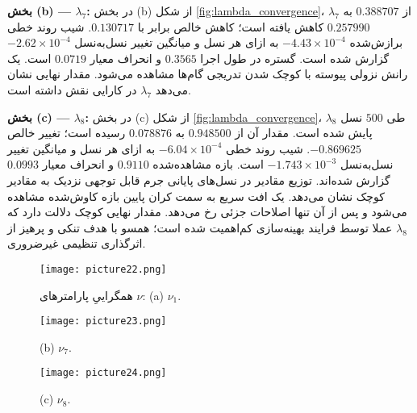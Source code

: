 \medskip
\textbf{بخش (b) — \(\lambda_7\):}
در بخش (b) از شکل \ref{fig:lambda_convergence}، \(\lambda_7\) از \(0.388707\) به \(0.257990\) کاهش یافته است؛ کاهش خالص برابر با \(0.130717\). شیب روند خطی برازش‌شده \(-4.43\times 10^{-4}\) به ازای هر نسل و میانگین تغییر نسل‌به‌نسل \(-2.62\times 10^{-4}\) گزارش شده است. گستره در طول اجرا \(0.3565\) و انحراف معیار \(0.0719\) است. یک رانش نزولی پیوسته با کوچک شدن تدریجی گام‌ها مشاهده می‌شود. مقدار نهایی نشان می‌دهد \(\lambda_7\) در کارایی  نقش داشته است.

\medskip
\textbf{بخش (c) — \(\lambda_8\):}
در بخش (c) از شکل \ref{fig:lambda_convergence}، \(\lambda_8\) طی \(500\) نسل پایش شده است. مقدار آن از \(0.948500\) به \(0.078876\) رسیده است؛ تغییر خالص \(-0.869625\). شیب روند خطی \(-6.04\times 10^{-4}\) به ازای هر نسل و میانگین تغییر نسل‌به‌نسل \(-1.743\times 10^{-3}\) است. بازه مشاهده‌شده \(0.9110\) و انحراف معیار \(0.0993\) گزارش شده‌اند. توزیع مقادیر در نسل‌های پایانی جرم قابل توجهی نزدیک به مقادیر کوچک نشان می‌دهد. یک افت سریع به سمت کران پایین بازه کاوش‌شده مشاهده می‌شود و پس از آن تنها اصلاحات جزئی رخ می‌دهد. مقدار نهایی کوچک دلالت دارد که \(\lambda_8\) عملا توسط فرایند بهینه‌سازی کم‌اهمیت شده است؛ همسو با هدف تنکی و پرهیز از اثرگذاری تنظیمی غیرضروری.



\begin{figure}[h]
  \centering
  \texttt{[image: picture22.png]}%
  \caption{همگراییِ پارامترهای \(\nu\): (a) \(\nu_1\).}
  \label{fig:nu_convergence}
\end{figure}

\begin{figure}[h]\ContinuedFloat
  \centering
  \texttt{[image: picture23.png]}%
  \caption{(b) \(\nu_7\).}
\end{figure}

\begin{figure}[h]\ContinuedFloat
  \centering
  \texttt{[image: picture24.png]}%
  \caption{(c) \(\nu_8\).}
\end{figure}

